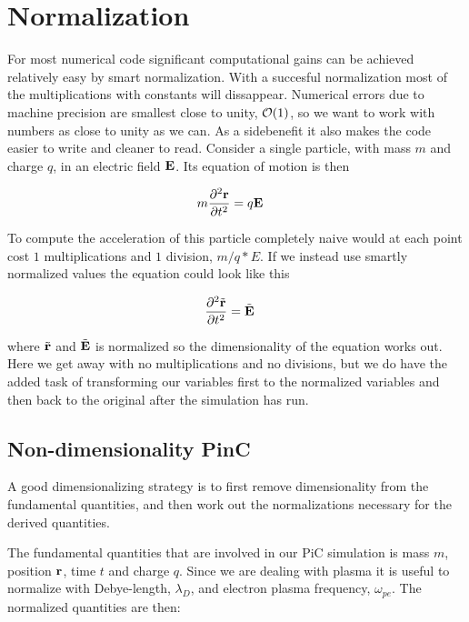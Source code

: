 \section{Normalization}
    For most numerical code significant computational gains can be achieved
    relatively easy by smart normalization. With a succesful normalization most
    of the multiplications with constants will dissappear. Numerical errors
    due to machine precision are smallest close to unity, \(\order{1}\), \citep{hjorth-jensen_computational_????} so we
    want to work with numbers as close to unity as we can. As a sidebenefit it also
    makes the code easier to write and cleaner to read. Consider a single particle,
    with mass \(m\) and charge \(q\), in an electric field \(\vb{E}\). Its equation of motion is then

    \begin{align}
        m\pdv[2]{\vb{r}}{t} &= q\vb{E}
    \end{align}

    To compute the acceleration of this particle completely naive would at each point
    cost \(1\) multiplications and \(1\) division, \(m/q*E\). If we instead use smartly normalized
    values the equation could look like this

    \begin{align}
        \pdv[2]{\tilde {\vb{r}}}{t} &= \tilde{\vb{E}}
    \end{align}

    where \(\tilde {\vb{r}}\) and \(\tilde{\vb{E}}\) is normalized so the dimensionality of the
    equation works out. Here we get away with no multiplications and no divisions,
    but we do have the added task of transforming our variables first to the normalized variables
    and then back to the original after the simulation has run.

    \subsection{Non-dimensionality PinC}
        A good dimensionalizing strategy is to first remove
        dimensionality from the fundamental quantities, and then work out the
        normalizations necessary for the derived quantities.

        The fundamental quantities that are involved in our PiC simulation is
        mass \(m\), position \(\vb{r}\), time \(t\) and charge \(q\). Since we are dealing with
        plasma it is useful to normalize with Debye-length, \(\lambda_D\), and electron plasma frequency, \(\omega_{pe}\).
        The normalized quantities are then:

